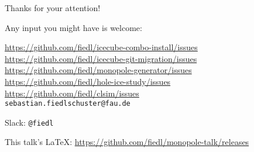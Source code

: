
\begin{frame}{Thanks for your attention!}
  \begin{center}
    Any input you might have is welcome: \\ \vspace{0.3cm}

\url{https://github.com/fiedl/icecube-combo-install/issues} \\ \vspace{0.2cm}
    \url{https://github.com/fiedl/icecube-git-migration/issues} \\
\vspace{0.2cm}
    \url{https://github.com/fiedl/monopole-generator/issues} \\ \vspace{0.2cm}
    \url{https://github.com/fiedl/hole-ice-study/issues} \\ \vspace{0.2cm}
    \url{https://github.com/fiedl/clsim/issues} \\ \vspace{0.5cm}
    \texttt{sebastian.fiedlschuster@fau.de}

    Slack: \texttt{@fiedl}

    \vfill

    This talk's \LaTeX: \url{https://github.com/fiedl/monopole-talk/releases}

  \end{center}
\end{frame}
